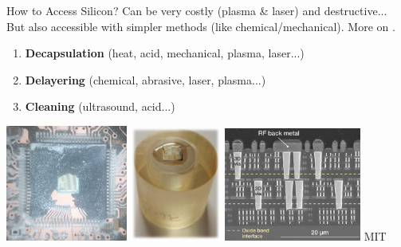\documentclass[aspectratio=169]{beamer}
\begin{document}
	
	\begin{frame}{How to Access Silicon?}	
		Can be very costly (plasma \& laser) and destructive... But also accessible with simpler methods (like chemical/mechanical). More on \cite{SiliconPron}.
		
		\begin{enumerate}
			\item \textbf{Decapsulation} (heat, acid, mechanical, plasma, laser...)
			\item \textbf{Delayering} (chemical, abrasive, laser, plasma...)
			\item \textbf{Cleaning} (ultrasound, acid...)
		\end{enumerate}
		
		\begin{center}
			\includegraphics[width=4cm]{res/decap.jpg}
			\cite{Holler2017}
			\includegraphics[width=3cm]{res/delayer.png}
			\cite{KarstenNohl2009}
			\includegraphics[width=4.5cm]{res/delayered.png}
			\tiny MIT
		\end{center}
	\end{frame}
	
\end{document}
